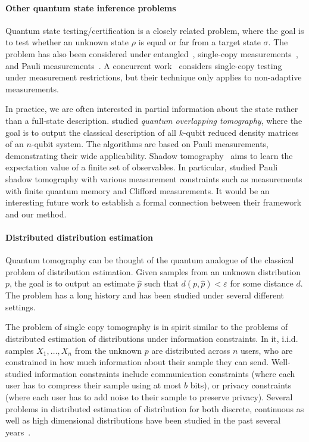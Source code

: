 \paragraph{Other quantum state inference problems} Quantum state testing/certification \cite{ODonnellW15,BadescuO019} is a closely related problem, where the goal is to test whether an unknown state $\rho$ is equal or far from a target state $\sigma$. The problem has also been considered under entangled~\cite{ODonnellW15,BadescuO019}, single-copy measurements~\cite{BubeckC020,Chen0HL22,liu2024role}, and Pauli measurements~\cite{Yu2023almost}. A concurrent work~\cite{liu2024restricted} considers single-copy testing under measurement restrictions, but their technique only applies to non-adaptive measurements.

In practice, we are often interested in partial information about the state rather than a full-state description. \cite{Cotler_2020, Garc_a_P_rez_2020, evans2019scalable} studied \textit{quantum overlapping tomography}, where the goal is to output the classical description of all $k$-qubit reduced
density matrices of an $n$-qubit system. The algorithms are based on Pauli measurements, demonstrating their wide applicability. 
Shadow tomography~\cite{Aaronson20, huang2020predicting, ChenCH021,chen2024pauli} aims to learn the expectation value of a finite set of observables. In particular, \cite{chen2024pauli} studied Pauli shadow tomography with various measurement constraints such as measurements with finite quantum memory and Clifford measurements. It would be an interesting future work to establish a formal connection between their framework and our method.


\paragraph{Distributed distribution estimation}

Quantum tomography can be thought of the quantum analogue of the classical problem of distribution estimation. Given samples from an unknown distribution $p$, the goal is to output an estimate $\hat p$ such that $d(p,\hat p)<\varepsilon$ for some distance $d$. The problem has a long history and has been studied under several different settings. 

The problem of single copy tomography is in spirit similar to the problems of distributed estimation of distributions under information constraints. 
In it, i.i.d. samples $X_1, \ldots, X_n$ from the unknown $p$ are distributed across $n$ users, who are constrained in how much information about their sample they can send. 
Well-studied information constraints include communication constraints (where each user has to compress their sample using at most $b$ bits), or privacy constraints (where each user has to add noise to their sample to preserve privacy). Several problems in distributed estimation of distribution for both discrete, continuous as well as high dimensional distributions have been studied in the past several years~\cite{duchi2013local, barnes2019lower, AcharyaCT19, acharya2020distributed}.